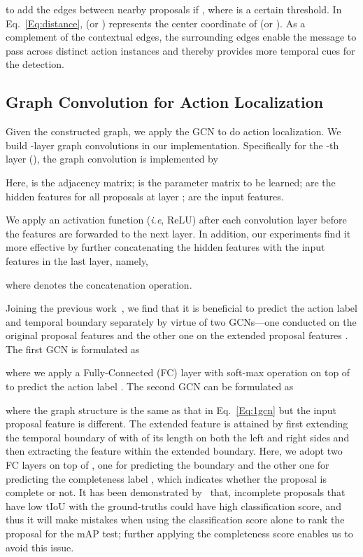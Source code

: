\documentclass[10pt,twocolumn,letterpaper]{article}
\def\ie{\emph{i.e}\onedot} \def\Ie{\emph{I.e}\onedot}
\begin{document}
	to add the edges between nearby proposals if , where  is a certain threshold. In Eq.~\eqref{Eq:distance},  (or ) represents the center coordinate of  (or ). 
	As a complement of the contextual edges, the surrounding edges enable the message to pass across distinct action instances and thereby provides more temporal cues for the detection. 
	


	\subsection{Graph Convolution for Action Localization} \label{Sec:gcn}
	
	Given the constructed graph, we apply the GCN to do action localization.
	We build -layer graph convolutions in our implementation. 
	Specifically for the -th layer (), the graph convolution is implemented by
	
	Here,  is the adjacency matrix;  is the parameter matrix to be learned;  are the hidden features for all proposals at layer ;  are the input features. 
	
	
	We apply an activation function (\ie, ReLU) after each convolution layer before the features are forwarded to the next layer. In addition, our experiments find it more effective by further concatenating the hidden features with the input features in the last layer, namely, 
	
	where  denotes the concatenation operation.   
	
Joining the previous work~\cite{zhao2017temporal}, we find that it is beneficial to predict the action label and temporal boundary separately by virtue of two GCNs---one conducted on the original proposal features  and the other one on the extended proposal features . The first GCN is formulated as 
	
	where we apply a Fully-Connected (FC) layer with soft-max operation on top of  to predict the action label . The second GCN can be formulated as 
	
	where the graph structure  is the same as that in Eq.~\eqref{Eq:1gcn} but the input proposal feature is different. The extended feature  is attained by first extending the temporal boundary of  with  of its length on both the left and right sides and then extracting the feature within the extended boundary. Here, we adopt two FC layers on top of , one for predicting the boundary  and the other one for predicting the completeness label , which indicates whether the proposal is complete or not. It has been demonstrated by~\cite{zhao2017temporal} that, incomplete proposals that have low tIoU with the ground-truths could have high classification score, and thus it will make mistakes when using the classification score alone to rank the proposal for the mAP test; further applying the completeness score enables us to avoid this issue.
	
\end{document}
